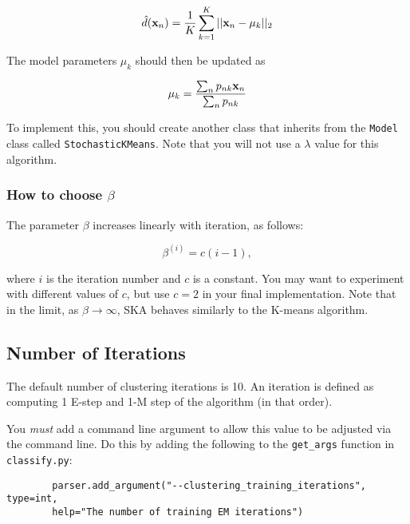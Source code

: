 \documentclass[11pt]{article}
\newcommand{\vxn}{{\bf x}_n}
\newcommand{\vmu}{{\bf \mu}}
\newcommand{\vmuk}{{\bf \mu}_k}
\newcommand{\code}[1]{{\footnotesize \tt #1}}
\begin{document}
\begin{equation}
\hat{d}(\vxn)= \frac{1}{K}\sum_{k=1}^{K}\vert\vert \vxn - \vmuk \vert\vert_2
\end{equation}

\noindent The model parameters $\mu_k$ should then be updated as

\begin{equation}
\vmu_{k}= \frac{\sum_n p_{nk} \vxn}{\sum_n p_{nk}}
\end{equation}

\noindent To implement this, you should create another class that inherits from the \code{Model} class called \code{StochasticKMeans}.  Note that you will not use a $\lambda$ value for this algorithm.

\subsubsection { How to choose $\beta$}
The parameter $\beta$ increases linearly with iteration, as follows:

\begin{equation}
\beta^{(i)} = c(i-1),
\end{equation}

\noindent where $i$ is the iteration number and $c$ is a constant. You may want to experiment with different values of $c$, but use $c = 2$ in your final implementation.  Note that in the limit, as $\beta \rightarrow  \infty$, SKA behaves similarly to the K-means algorithm.

\subsection{Number of Iterations}
\label{sec:iterations}

The default number of clustering iterations is 10. An iteration is defined as computing 1 E-step and 1-M step of the algorithm (in that order).

You \emph{must} add a command line argument to allow this value to be adjusted via the command line.  Do this by
adding the following to the \code{get\_args} function in \code{classify.py}:
	\begin{footnotesize}
		\begin{verbatim}
		parser.add_argument("--clustering_training_iterations", type=int, 
		help="The number of training EM iterations")
		\end{verbatim}
	\end{footnotesize}
\end{document}
